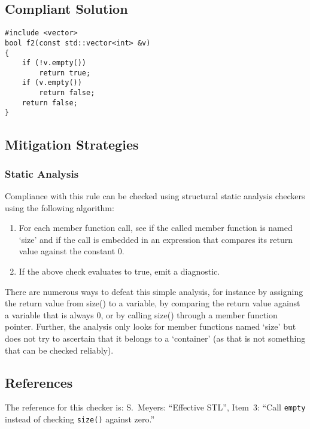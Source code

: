 \subsection{Compliant Solution}

\begin{verbatim}
#include <vector>
bool f2(const std::vector<int> &v)
{
    if (!v.empty())
        return true;
    if (v.empty())
        return false;
    return false;
}
\end{verbatim}

\subsection{Mitigation Strategies}
\subsubsection{Static Analysis} 

Compliance with this rule can be checked using structural static analysis checkers using the following algorithm:

\begin{enumerate}
\item For each member function call, see if the called member function is
named `size' and if the call is embedded in an expression that compares its
return value against the constant 0.
\item If the above check evaluates to true, emit a diagnostic.
\end{enumerate}

There are numerous ways to defeat this simple analysis, for instance by
assigning the return value from size() to a variable, by comparing the return
value against a variable that is always 0, or by calling size() through a
member function pointer. Further, the analysis only looks for member functions
named `size' but does not try to ascertain that it belongs to a `container'
(as that is not something that can be checked reliably).

\subsection{References}

The reference for this checker is: S.~Meyers: ``Effective STL'', Item~3:
``Call \verb+empty+ instead of checking \verb+size()+ against zero.''
